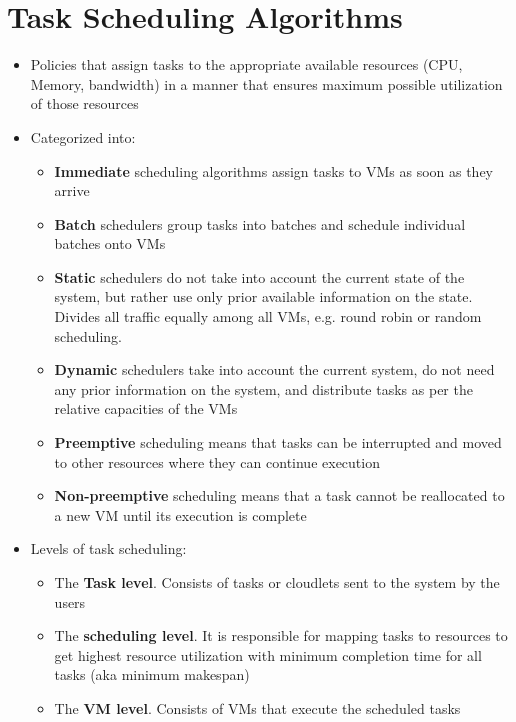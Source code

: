 \documentclass{article}
\begin{document}
\section{Task Scheduling Algorithms}
\begin{itemize}
    \item Policies that assign tasks to the appropriate available resources (CPU, Memory, bandwidth) in a manner that ensures maximum possible utilization of those resources
    
    \item Categorized into:
    \begin{itemize}
        \item \textbf{Immediate} scheduling algorithms assign tasks to VMs as soon as they arrive
        
        \item \textbf{Batch} schedulers group tasks into batches and schedule individual batches onto VMs
        
        \item \textbf{Static} schedulers do not take into account the current state of the system, but rather use only prior available information on the state. Divides all traffic equally among all VMs, e.g. round robin or random scheduling.
        
        \item\textbf{Dynamic} schedulers take into account the current system, do not need any prior information on the system, and distribute tasks as per the relative capacities of the VMs
        
        \item \textbf{Preemptive} scheduling means that tasks can be interrupted and moved to other resources where they can continue execution
        
        \item \textbf{Non-preemptive} scheduling means that a task cannot be reallocated to a new VM until its execution is complete
    \end{itemize}
    
    \item Levels of task scheduling:
    \begin{itemize}
        \item The \textbf{Task level}. Consists of tasks or cloudlets sent to the system by the users
        
        \item The \textbf{scheduling level}. It is responsible for mapping tasks to resources to get highest resource utilization with minimum completion time for all tasks (aka minimum makespan)
        
        \item The \textbf{VM level}. Consists of VMs that execute the scheduled tasks
    \end{itemize}
\end{itemize} 
\end{document}
